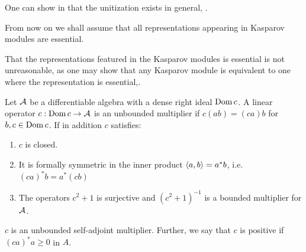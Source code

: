 One can show in that the unitization exists in general, \cite{meyer}.  
\begin{assumption}
	From now on we shall assume that all representations appearing in Kasparov modules are essential. 
\end{assumption}
\begin{remark}
	That the representations featured in the Kasparov modules is essential is not unreasonable, as one may show that any Kasparov module is equivalent to one where the representation is essential,\cite{kasparov}.
\end{remark}
\begin{definition}
	Let $\mathcal{A}$ be a differentiable algebra with a dense right ideal $\operatorname{Dom} c$. A linear operator $c:\operatorname{Dom} c\to \mathcal{A}$ is an unbounded multiplier if $c(ab)=(ca)b$ for $b,c\in \operatorname{Dom} c$. If in addition $c$ satisfies:
	\begin{enumerate}
	\item
		$c$ is closed.
	\item
		It is formally symmetric in the inner product $\left \langle a,b \right \rangle=a^*b$, i.e. $(ca)^*b=a^*(cb)$ 
	\item
		The operators $c^2+1$ is surjective and $(c^2+1)^{-1}$ is a bounded multiplier for $\mathcal{A}$. 
	\end{enumerate}
	$c$ is an unbounded self-adjoint multiplier.  
	Further, we say that $c$ is positive if $(ca)^*a\geq 0$ in $A$. 
\end{definition}

